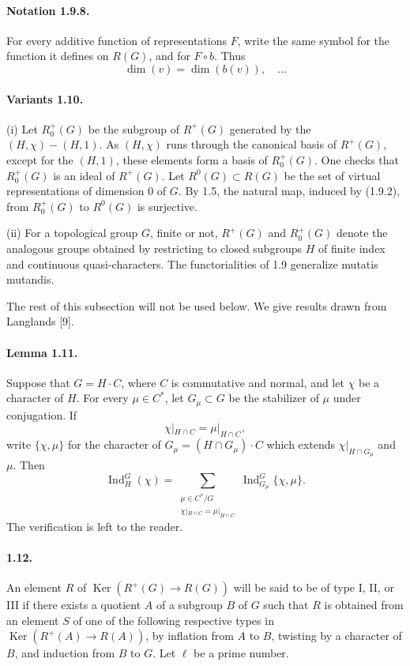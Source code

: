 \documentclass[10pt]{article}
\newcommand{\Ind}{\operatorname{Ind}}
\providecommand{\Ker}{\operatorname{Ker}}
\begin{document}
\paragraph{Notation 1.9.8.} For every additive function of representations \(F\), write the same symbol for the function it defines on \(R(G)\), and for \(F\circ b\). Thus
\[
\dim(v)=\dim(b(v)),\quad\ldots
\]

\paragraph{Variants 1.10.} (i) Let \(R^+_0(G)\) be the subgroup of \(R^+(G)\) generated by the \((H,\chi)-(H,1)\). As \((H,\chi)\) runs through the canonical basis of \(R^+(G)\), except for the \((H,1)\), these elements form a basis of \(R^+_0(G)\). One checks that \(R^+_0(G)\) is an ideal of \(R^+(G)\). Let \(R^0(G)\subset R(G)\) be the set of virtual representations of dimension \(0\) of \(G\). By 1.5, the natural map, induced by (1.9.2), from \(R^+_0(G)\) to \(R^0(G)\) is surjective.

(ii) For a topological group \(G\), finite or not, \(R^+(G)\) and \(R^+_0(G)\) denote the analogous groups obtained by restricting to closed subgroups \(H\) of finite index and continuous quasi-characters. The functorialities of 1.9 generalize mutatis mutandis.

The rest of this subsection will not be used below. We give results drawn from Langlands [9].

\paragraph{Lemma 1.11.} Suppose that \(G=H\cdot C\), where \(C\) is commutative and normal, and let \(\chi\) be a character of \(H\). For every \(\mu\in C^*\), let \(G_\mu\subset G\) be the stabilizer of \(\mu\) under conjugation. If
\[
\chi|_{H\cap C}=\mu|_{H\cap C},
\]
write \(\{\chi,\mu\}\) for the character of \(G_\mu=(H\cap G_\mu)\cdot C\) which extends \(\chi|_{H\cap G_\mu}\) and \(\mu\). Then
\[
\Ind_H^G(\chi)=
\sum_{\substack{\mu\in C^*/G\\ \chi|_{H\cap C}=\mu|_{H\cap C}}}
\Ind_{G_\mu}^G\{\chi,\mu\}.
\]
The verification is left to the reader.

\paragraph{1.12.} An element \(R\) of \(\Ker(R^+(G)\to R(G))\) will be said to be of type I, II, or III if there exists a quotient \(A\) of a subgroup \(B\) of \(G\) such that \(R\) is obtained from an element \(S\) of one of the following respective types in \(\Ker(R^+(A)\to R(A))\), by inflation from \(A\) to \(B\), twisting by a character of \(B\), and induction from \(B\) to \(G\). Let \(\ell\) be a prime number.
\end{document}
